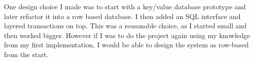 \documentclass[12pt,twoside,notitlepage]{report}
\begin{document}
One design choice I made was to start with a key/value database prototype and later
refactor it into a row based database. I then added an SQL interface and layered transactions on
top. This was a reasonable choice, as I started small and then worked bigger. However if I was to
do the project again using my knowledge from my first implementation, I would be able to
design the system as row-based from the start.


\end{document}
